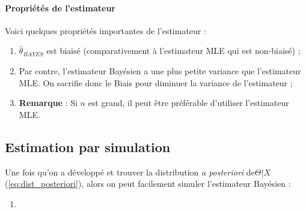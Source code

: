 \documentclass[12pt, french]{report}
\begin{document}
\paragraph{Propriétés de l'estimateur} Voici quelques propriétés importantes de l'estimateur : 
\begin{enumerate}[label = \faAngleRight]
\item $\hat{\theta}_{BAYES}$ est biaisé (comparativement à l'estimateur MLE qui est non-biaisé) ;
\item Par contre, l'estimateur Bayésien a une plus petite variance que l'estimateur MLE. On sacrifie donc le Biais pour diminuer la variance de l'estimateur ;
\item \textbf{Remarque} : Si $n$ est grand,  il peut être préférable d'utiliser l'estimateur MLE.
\end{enumerate}

\subsection{Estimation par simulation}
Une fois qu'on a développé et trouver la distribution \emph{a posteriori} de$\Theta | X$ (\autoref{eq:dist_posteriori}), alors on peut facilement simuler l'estimateur Bayésien :
\begin{enumerate}
\item 
\end{enumerate}
\end{document}
